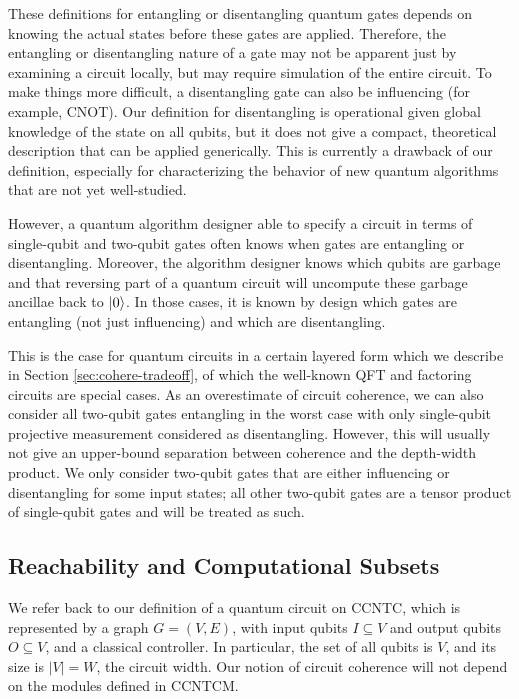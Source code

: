 These definitions for entangling or disentangling quantum gates
depends on knowing the actual states before these gates are applied.
Therefore, the entangling or disentangling nature of a gate
may not be apparent just by examining a circuit locally,
but may require simulation of the entire circuit.
To make things more difficult, a disentangling gate can also be
influencing (for example, CNOT).
Our definition for disentangling is operational given global knowledge of
the state on all qubits, but it does
not give
a compact, theoretical description that can be applied generically.
This is
currently a drawback of our definition, especially for characterizing the
behavior of new quantum algorithms that are not yet well-studied.

However, a quantum algorithm designer able to specify a circuit in terms of
single-qubit and
two-qubit gates often knows when gates are entangling or disentangling.
Moreover, the algorithm designer knows which qubits are garbage and that reversing
part of a quantum circuit will uncompute these garbage ancillae back to $\left\vert{0}\right\rangle$.
In those cases, it is known by design which gates are entangling
(not just influencing) and which are disentangling.

This is the case for
quantum circuits in a certain layered form which we describe in
Section \ref{sec:cohere-tradeoff},
of which the 
well-known QFT and factoring circuits are special cases.
As an overestimate of circuit coherence, we can also consider all
two-qubit gates entangling in the worst case
with
only single-qubit projective measurement considered as disentangling.
However, this will usually
not give an upper-bound separation between coherence and the depth-width product.
We only consider two-qubit gates that are either influencing or disentangling
for some input states; all other two-qubit gates are a tensor product of
single-qubit gates and will be treated as such.

\subsection{Reachability and Computational Subsets}
\label{subsec:cohere-subset}

We refer back to our definition of a quantum circuit on
\textsf{CCNTC}, which is represented by a graph $G = (V,E)$,
with input qubits $I \subseteq V$ and output qubits $O \subseteq V$, and a
classical controller. In particular, the set of all qubits is $V$,
and its size is $|V|=W$, the circuit width.
Our notion of circuit coherence will not depend
on the modules defined in \textsf{CCNTCM}.

